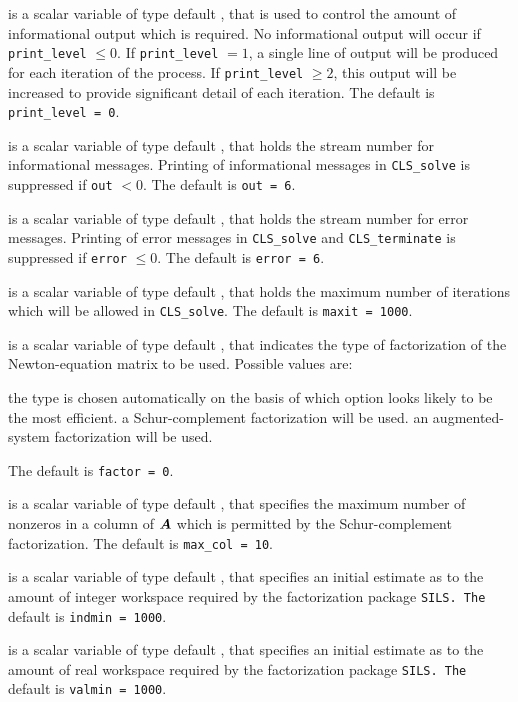 \documentclass{galahad}
\newcommand{\packagename}{CLS}
\begin{document}
\begin{description}

 is a scalar variable of type default \integer, that is used
to control the amount of informational output which is required. No 
informational output will occur if {\tt print\_level} $\leq 0$. If 
{\tt print\_level} $= 1$, a single line of output will be produced for each
iteration of the process. If {\tt print\_level} $\geq 2$, this output will be
increased to provide significant detail of each iteration.
The default is {\tt print\_level = 0}.

 is a scalar variable of type default \integer, that holds the
stream number for informational messages. Printing of informational messages in 
{\tt \packagename\_solve} is suppressed if {\tt out} $< 0$.
The default is {\tt out = 6}.

 is a scalar variable of type default \integer, that holds the
stream number for error messages. Printing of error messages in 
{\tt \packagename\_solve} and {\tt \packagename\_terminate} is suppressed if 
{\tt error} $\leq 0$.
The default is {\tt error = 6}.

 is a scalar variable of type default \integer, that holds the
maximum number of iterations which will be allowed in {\tt \packagename\_solve}.
The default is {\tt maxit = 1000}.

 is a scalar variable of type default \integer, that indicates
the type of factorization of the Newton-equation matrix to be used.  
Possible values are:

\begin{description}
 the type is chosen automatically on the basis of which option looks
        likely to be the most efficient.
 a Schur-complement factorization will be used.
 an augmented-system factorization will be used.
\end{description}
The default is {\tt factor = 0}.

 is a scalar variable of type default \integer, that specifies
the maximum number of nonzeros in a column of ${\bm{A}}$ which is permitted
by the Schur-complement factorization.
The default is {\tt max\_col = 10}.

 is a scalar variable of type default \integer, that specifies
an initial estimate as to the amount of integer workspace required by 
the factorization package {\tt SILS.
The} default is {\tt indmin = 1000}.

 is a scalar variable of type default \integer, that specifies
an initial estimate as to the amount of real workspace required by 
the factorization package {\tt SILS.
The} default is {\tt valmin = 1000}.


\end{description}
\end{document}
